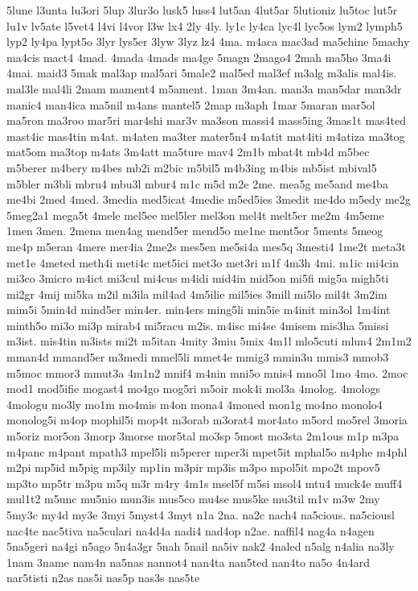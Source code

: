 {5lune
l3unta
lu3ori
5lup
3lur3o
lusk5
luss4
lut5an
4lut5ar
5lutioniz
lu5toc
lut5r
lu1v
lv5ate
l5vet4
l4vi
l4vor
l3w
lx4
2ly
4ly.
ly1c
ly4ca
lyc4l
lyc5os
lym2
lymph5
lyp2
ly4pa
lypt5o
3lyr
lys5er
3lyw
3lyz
lz4
4ma.
m4aca
mac3ad
ma5chine
5machy
ma4cis
mact4
4mad.
4mada
4mads
ma4ge
5magn
2mago4
2mah
ma5ho
3ma4i
4mai.
maid3
5mak
mal3ap
mal5ari
5male2
mal5ed
mal3ef
m3alg
m3alis
mal4is.
mal3le
mal4li
2mam
mament4
m5ament.
1man
3m4an.
man3a
man5dar
man3dr
manic4
man4ica
ma5nil
m4ans
mantel5
2map
m3aph
1mar
5maran
mar5ol
ma5ron
ma3roo
mar5ri
mar4shi
mar3v
ma3son
massi4
mass5ing
3mas1t
mas4ted
mast4ic
mas4tin
m4at.
m4aten
ma3ter
mater5n4
m4atit
mat4iti
m4atiza
ma3tog
mat5om
ma3top
m4ats
3m4att
ma5ture
mav4
2m1b
mbat4t
mb4d
m5bec
m5berer
m4bery
m4bes
mb2i
m2bic
m5bil5
m4b3ing
m4bis
mb5ist
mbival5
m5bler
m3bli
mbru4
mbu3l
mbur4
m1c
m5d
m2e
2me.
mea5g
me5and
me4ba
me4bi
2med
4med.
3media
med5icat
4medie
m5ed5ies
3medit
me4do
m5edy
me2g
5meg2a1
mega5t
4mele
mel5ee
mel5ler
mel3on
mel4t
melt5er
me2m
4m5eme
1men
3men.
2mena
men4ag
mend5er
mend5o
me1ne
ment5or
5ments
5meog
me4p
m5eran
4mere
mer4ia
2me2s
mes5en
me5si4a
mes5q
3mesti4
1me2t
meta3t
met1e
4meted
meth4i
meti4c
met5ici
met3o
met3ri
m1f
4m3h
4mi.
m1ic
mi4cin
mi3co
3micro
m4ict
mi3cul
mi4cus
m4idi
mid4in
mid5on
mi5fi
mig5a
migh5ti
mi2gr
4mij
mi5ka
m2il
m3ila
mil4ad
4m5ilie
mil5ies
3mill
mi5lo
mil4t
3m2im
mim5i
5min4d
mind5er
min4er.
min4ers
ming5li
min5ie
m4init
min3ol
1m4int
minth5o
mi3o
mi3p
mirab4
mi5racu
m2is.
m4isc
mi4se
4misem
mis3ha
5missi
m3ist.
mis4tin
m3ists
mi2t
m5itan
4mity
3miu
5mix
4m1l
mlo5cuti
mlun4
2m1m2
mman4d
mmand5er
m3medi
mmel5li
mmet4e
mmig3
mmin3u
mmis3
mmob3
m5moc
mmor3
mmut3a
4m1n2
mnif4
m4nin
mni5o
mnis4
mno5l
1mo
4mo.
2moc
mod1
mod5ifie
mogast4
mo4go
mog5ri
m5oir
mok4i
mol3a
4molog.
4mologs
4mologu
mo3ly
mo1m
mo4mis
m4on
mona4
4moned
mon1g
mo4no
monolo4
monolog5i
m4op
mophil5i
mop4t
m3orab
m3orat4
mor4ato
m5ord
mo5rel
3moria
m5oriz
mor5on
3morp
3morse
mor5tal
mo3sp
5most
mo3sta
2m1ous
m1p
m3pa
m4panc
m4pant
mpath3
mpel5li
m5perer
mper3i
mpet5it
mphal5o
m4phe
m4phl
m2pi
mp5id
m5pig
mp3ily
mp1in
m3pir
mp3is
m3po
mpol5it
mpo2t
mpov5
mp3to
mp5tr
m3pu
m5q
m3r
m4ry
4m1s
msel5f
m5si
msol4
mtu4
muck4e
muff4
mul1t2
m5unc
mu5nio
mun3is
mus5co
mu4se
mus5ke
mu3til
m1v
m3w
2my
5my3c
my4d
my3e
3myi
5myst4
3myt
n1a
2na.
na2c
nach4
na5cious.
na5ciousl
nac4te
nac5tiva
na5culari
na4d4a
nadi4
nad4op
n2ae.
naffil4
nag4a
n4agen
5na5geri
na4gi
n5ago
5n4a3gr
5nah
5nail
na5iv
nak2
4naled
n5alg
n4alia
na3ly
1nam
3name
nam4n
na5nas
nannot4
nan4ta
nan5ted
nan4to
na5o
4n4ard
nar5tisti
n2as
nas5i
nas5p
nas3s
nas5te
}
